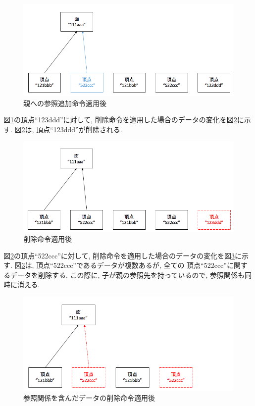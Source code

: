 \begin{figure}[]
  \begin{center}
    \includegraphics[scale=0.45]{images/ope2}
    \caption{親への参照追加命令適用後}
    \label{命令2}
  \end{center}
\end{figure}
図\ref{命令2}の頂点``123ddd''に対して, 削除命令を適用した場合のデータの変化を図\ref{命令3}に示す. 図\ref{命令3}は, 頂点``123ddd''が削除される.
\begin{figure}[]
  \begin{center}
    \includegraphics[scale=0.45]{images/ope3}
    \caption{削除命令適用後}
    \label{命令3}
  \end{center}
\end{figure}
図\ref{命令3}の頂点``522ccc''に対して, 削除命令を適用した場合のデータの変化を図\ref{命令4}に示す. 図\ref{命令4}は, 頂点``522ccc''であるデータが複数あるが, 全ての 頂点``522ccc''に関するデータを削除する. この際に, 子が親の参照先を持っているので, 参照関係も同時に消える.
\begin{figure}[]
  \begin{center}
    \includegraphics[scale=0.45]{images/ope4}
    \caption{参照関係を含んだデータの削除命令適用後}
    \label{命令4}
  \end{center}
\end{figure}
